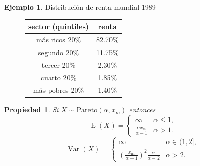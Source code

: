 \documentclass[]{book}
\theoremstyle{plain}
\newtheorem{property}[theorem]{Propiedad}
\theoremstyle{definition}
\newtheorem{example}[theorem]{Ejemplo}
\theoremstyle{definition} %
\begin{document}
\begin{example}
 

Distribución de renta mundial 1989

\begin{figure}[htbp]
  \centering
    \begin{tabular}{cc}
       sector (quintiles)& renta \\
       \hline
       más ricos 20\% 	&82.70\% \\ 
        segundo  20\% 	&11.75\% \\ 
        tercer 20\%   	&2.30\% \\
        cuarto 20\% 	&1.85\% \\
        más pobres 20\% 	&1.40\%  \\
      \end{tabular}
\end{figure}

\end{example}

\begin{property}
Si $X\sim \text{Pareto}(\alpha, x_m)$ entonces 
\[\operatorname {E} (X)={\begin{cases}\infty &\alpha \leq 1,\\{\frac {\alpha x_{\mathrm {m} }}{\alpha -1}}&\alpha >1.\end{cases}}\]
\[
  \operatorname {Var} (X)={\begin{cases}\infty &\alpha \in (1,2],\\\left({\frac {x_{\mathrm {m} }}{\alpha -1}}\right)^{2}{\frac {\alpha }{\alpha -2}}&\alpha >2.\end{cases}}  
\]

\end{property}
\end{document}
